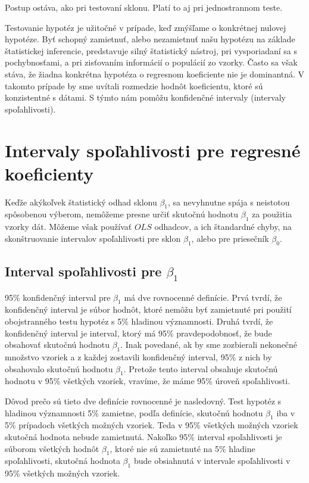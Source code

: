 \documentclass[]{tukediphc}
\begin{document}
Postup ostáva, ako pri testovaní sklonu. Platí to aj pri jednostrannom teste.

Testovanie hypotéz je užitočné v prípade, keď zmýšľame o konkrétnej nulovej hypotéze. Byť schopný zamietnuť, alebo nezamietnuť našu hypotézu na základe štatistickej inferencie, predstavuje silný štatistický nástroj, pri vysporiadaní sa s pochybnosťami, a pri zisťovaním informácií o populácií zo vzorky. Často sa však stáva, že žiadna konkrétna hypotéza o regresnom koeficiente nie je dominantná. V takomto prípade by sme uvítali rozmedzie hodnôt koeficientu, ktoré sú konzistentné s dátami. S týmto nám pomôžu konfidenčné intervaly (intervaly spoľahlivosti). 

\section{Intervaly spoľahlivosti pre regresné koeficienty}

Keďže akýkoľvek štatistický odhad sklonu $\beta_{1}$, sa nevyhnutne spája s neistotou spôsobenou výberom, nemôžeme presne určiť skutočnú hodnotu $\beta_{1}$ za použitia vzorky dát. Môžeme však používať $OLS$ odhadcov, a ich štandardné chyby, na skonštruovanie intervalov spoľahlivosti pre sklon $\beta_{1}$, alebo pre priesečník $\beta_{0}$. 

\subsection{Interval spoľahlivosti pre $\beta_{1}$}

95\% konfidenčný interval pre $\beta_{1}$ má dve rovnocenné definície. Prvá tvrdí, že konfidenčný interval je súbor hodnôt, ktoré nemôžu byť zamietnuté pri použití obojstranného testu hypotéz s 5\% hladinou významnosti. Druhá tvrdí, že konfidenčný interval je interval, ktorý má 95\% pravdepodobnosť, že bude obsahovať skutočnú hodnotu $\beta_{1}$. Inak povedané, ak by sme zozbierali nekonečné množstvo vzoriek a z každej zostavili konfidenčný interval, 95\% z nich by obsahovalo skutočnú hodnotu $\beta_{1}$. Pretože tento interval obsahuje skutočnú hodnotu v 95\% všetkých vzoriek, vravíme, že máme 95\% úroveň spoľahlivosti.

Dôvod prečo sú tieto dve definície rovnocenné je nasledovný. Test hypotéz s hladinou významnosti 5\% zamietne, podľa definície, skutočnú hodnotu $\beta_{1}$ iba v 5\% prípadoch všetkých možných vzoriek. Teda v 95\% všetkých možných vzoriek skutočná hodnota nebude zamietnutá. Nakoľko 95\% interval spoľahlivosti je súborom všetkých hodnôt $\beta_{1}$, ktoré nie sú zamietnuté na 5\% hladine spoľahlivosti, skutočná hodnota $\beta_{1}$ bude obsiahnutá v intervale spoľahlivosti v 95\% všetkých možných vzoriek.
\end{document}
